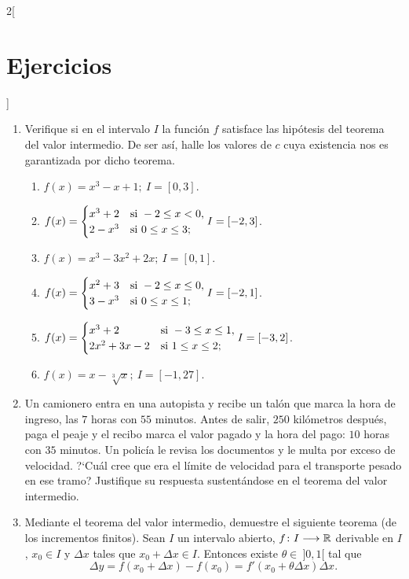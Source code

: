 \begin{multicols}{2}[\section{Ejercicios}]
\begin{enumerate}[leftmargin=*]
\item Verifique si en el intervalo $I$ la función $f$ satisface las hipótesis del teorema del
    valor intermedio. De ser así, halle los valores de $c$ cuya existencia nos es garantizada
    por dicho teorema.
    \begin{enumerate}[leftmargin=*]
    \item $\displaystyle f(x) = x^3 - x + 1;\ I = [0,3]$.
    \item $\displaystyle f(x) =
          \begin{cases}
            x^3 + 2 & \text{si } -2\leq x < 0,\\
            2 - x^3 & \text{si } 0 \leq x \leq 3;
          \end{cases}\\[6pt]
          I = [-2,3]$.
    \item $\displaystyle f(x) = x^3 - 3x^2 + 2x;\ I = [0,1]$.
    \item $\displaystyle f(x) =
          \begin{cases}
            x^2 + 3 & \text{si } -2 \leq x \leq 0, \\
            3 - x^3 & \text{si } 0 \leq x \leq 1;
          \end{cases}\\[6pt]
          I = [-2,1]$.
    \item $\displaystyle f(x) =
          \begin{cases}
            x^3 + 2 & \text{si } -3 \leq x \leq 1, \\
            2x^2 + 3x - 2 & \text{si } 1 \leq x \leq 2;
          \end{cases}\\[6pt]
          I = [-3,2]$.
    \item $\displaystyle f(x) = x - \sqrt[3]{x};\ I = [-1,27]$.
    \end{enumerate}

\item Un camionero entra en una autopista y recibe un talón que marca la hora de ingreso, las
    $7$ horas con $55$ minutos. Antes de salir, $250$ kilómetros después, paga el peaje y el
    recibo marca el valor pagado y la hora del pago: $10$ horas con $35$ minutos. Un policía le
    revisa los documentos y le multa por exceso de velocidad. ?`Cuál cree que era el límite de
    velocidad para el transporte pesado en ese tramo? Justifique su respuesta sustentándose en
    el teorema del valor intermedio.

\item Mediante el teorema del valor intermedio, demuestre el siguiente teorema (de los
    incrementos finitos). Sean $I$ un intervalo abierto, $f\colon I\longrightarrow \mathbb{R}$ derivable en
    $I$, $x_0\in I$ y $\Delta x$ tales que $x_0 + \Delta x \in I$. Entonces existe $\theta\in\
    ]0,1[$ tal que
    \[
      \Delta y = f(x_0 + \Delta x) - f(x_0) = f'(x_0 + \theta\Delta x)\Delta x.
    \]


\end{enumerate}
\end{multicols}
